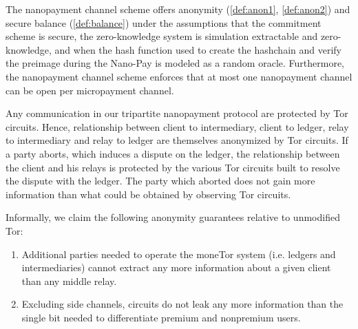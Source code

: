\begin{theorem}
  The nanopayment channel scheme offers anonymity (\ref{def:anon1},
  \ref{def:anon2}) and secure balance (\ref{def:balance}) under the assumptions
  that the commitment scheme is secure, the zero-knowledge system is simulation
  extractable and zero-knowledge, and when the hash function used to create the
  hashchain and verify the preimage during the Nano-Pay is modeled as a random
  oracle.
%
    Furthermore, the nanopayment channel scheme enforces that at most one
    nanopayment channel can be open per micropayment channel.


\end{theorem}

Any communication in our tripartite nanopayment protocol are protected by Tor
circuits. Hence, relationship between client to intermediary, client to ledger,
relay to intermediary and relay to ledger are themselves anonymized by Tor
circuits. If a party aborts, which induces a dispute on the ledger, the
relationship between the client and his relays is protected by the various Tor
circuits built to resolve the dispute with the ledger. The party which aborted
does not gain more information than what could be obtained by observing Tor
circuits.

Informally, we claim the following anonymity guarantees relative to unmodified
Tor:

\begin{enumerate}
\item Additional parties needed to operate the moneTor system (i.e. ledgers and
  intermediaries) cannot extract any more information about a given client than
  any middle relay.
\item Excluding side channels, circuits do not leak any more information than
  the single bit needed to differentiate premium and nonpremium users.
\end{enumerate}

